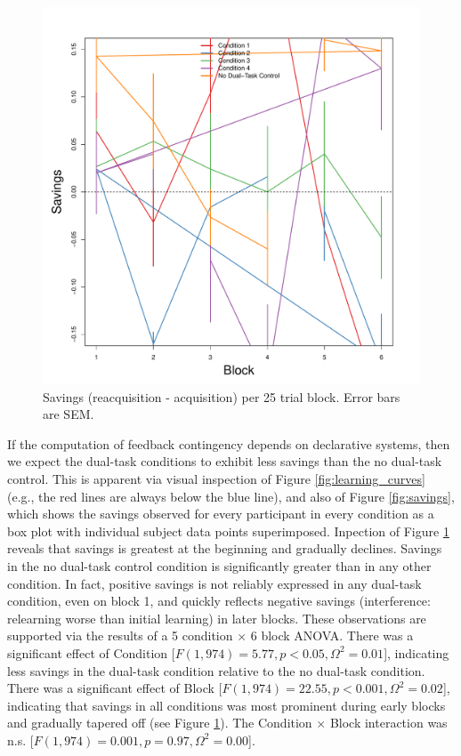 \begin{figure}[t]
  \centering \includegraphics[width=1.0\textwidth]{../figures/fig_savings_per_block.pdf}
  \caption{
    Savings (reacquisition - acquisition) per 25 trial block. 
    Error bars are SEM. 
  }
  \label{fig:savings_per_block}
\end{figure}

If the computation of feedback contingency depends on declarative systems, then
we expect the dual-task conditions to exhibit less savings than the no dual-task
control. This is apparent via visual inspection of Figure
\ref{fig:learning_curves} (e.g., the red lines are always below the blue line),
and also of Figure \ref{fig:savings}, which shows the savings observed for every
participant in every condition as a box plot with individual subject data points
superimposed. Inpection of Figure \ref{fig:savings_per_block} reveals that
savings is greatest at the beginning and gradually declines. Savings in the no
dual-task control condition is significantly greater than in any other
condition. In fact, positive savings is not reliably expressed in any dual-task
condition, even on block 1, and quickly reflects negative savings (interference:
relearning worse than initial learning) in later blocks. These observations are
supported via the results of a 5 condition $\times$ 6 block ANOVA. There was a
significant effect of Condition [$F(1,974) = 5.77, p < 0.05, \Omega^2 = 0.01$],
indicating less savings in the dual-task condition relative to the no dual-task
condition. There was a significant effect of Block [$F(1,974) = 22.55, p <
0.001, \Omega^2 = 0.02$], indicating that savings in all conditions was most
prominent during early blocks and gradually tapered off (see Figure
\ref{fig:savings_per_block}). The Condition $\times$ Block interaction was n.s.
[$F(1,974) = 0.001, p = 0.97, \Omega^2 = 0.00$].
    
